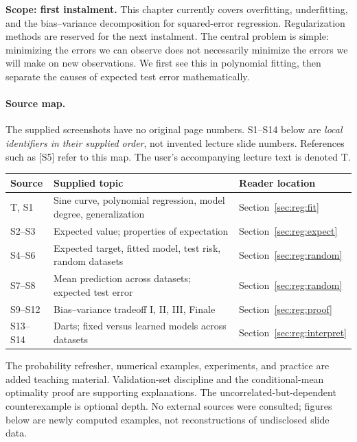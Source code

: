 \noindent\textbf{Scope: first instalment.} This chapter currently covers overfitting, underfitting, and the bias--variance decomposition for squared-error regression. Regularization methods are reserved for the next instalment. The central problem is simple: minimizing the errors we can observe does not necessarily minimize the errors we will make on new observations. We first see this in polynomial fitting, then separate the causes of expected test error mathematically.

\paragraph{Source map.} The supplied screenshots have no original page numbers. S1--S14 below are \emph{local identifiers in their supplied order}, not invented lecture slide numbers. References such as [S5] refer to this map. The user's accompanying lecture text is denoted T.
\begin{center}\small
\begin{tabular}{p{.10\linewidth}p{.51\linewidth}p{.28\linewidth}}
\toprule Source & Supplied topic & Reader location\\\midrule
T, S1 & Sine curve, polynomial regression, model degree, generalization & Section~\ref{sec:reg:fit}\\
S2--S3 & Expected value; properties of expectation & Section~\ref{sec:reg:expect}\\
S4--S6 & Expected target, fitted model, test risk, random datasets & Section~\ref{sec:reg:random}\\
S7--S8 & Mean prediction across datasets; expected test error & Section~\ref{sec:reg:random}\\
S9--S12 & Bias--variance tradeoff I, II, III, Finale & Section~\ref{sec:reg:proof}\\
S13--S14 & Darts; fixed versus learned models across datasets & Section~\ref{sec:reg:interpret}\\\bottomrule
\end{tabular}
\end{center}
The probability refresher, numerical examples, experiments, and practice are added teaching material. Validation-set discipline and the conditional-mean optimality proof are supporting explanations. The uncorrelated-but-dependent counterexample is optional depth. No external sources were consulted; figures below are newly computed examples, not reconstructions of undisclosed slide data.

